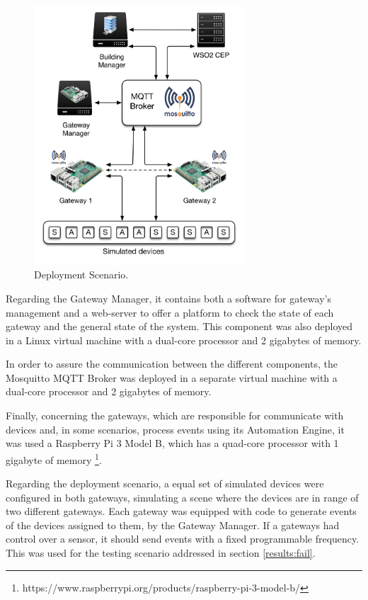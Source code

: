 \begin{figure}[H]
	\centering
	\includegraphics[width=0.7\textwidth]{figures/deployment.png}
	\caption{Deployment Scenario.}
	\label{fig:deploy}
\end{figure}

Regarding the Gateway Manager, it contains both a software for gateway's management and a web-server to offer a platform to check the state of each gateway and the general state of the system. This component was also deployed in a Linux virtual machine with a dual-core processor and 2 gigabytes of memory.

In order to assure the communication between the different components, the Mosquitto MQTT Broker was deployed in a separate virtual machine with a dual-core processor and 2 gigabytes of memory.

Finally, concerning the gateways, which are responsible for communicate with devices and, in some scenarios, process events using its Automation Engine, it was used a Raspberry Pi 3 Model B, which has a quad-core processor with 1 gigabyte of memory \footnote{https://www.raspberrypi.org/products/raspberry-pi-3-model-b/}. 

Regarding the deployment scenario, a equal set of simulated devices were configured in both gateways, simulating a scene where the devices are in range of two different gateways. Each gateway was equipped with code to generate events of the devices assigned to them, by the Gateway Manager. If a gateways had control over a sensor, it should send events with a fixed programmable frequency. This was used for the testing scenario addressed in section \ref{results:fail}. %

